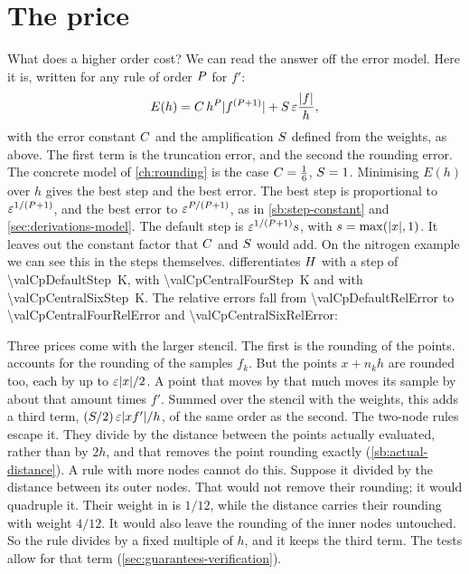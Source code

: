 \section{The price}\label{sec:stencils-price}

What does a higher order cost? We can read the answer off the error model. Here it is, written for any rule of order
$P$ for $f'$:
\begin{equation}
  E(h) = C\, h^{P} \lvert f^{(P + 1)} \rvert + S\, \varepsilon \frac{\lvert f \rvert}{h},
  \label{eq:stencils-model}
\end{equation}
with the error constant $C$ and the amplification $S$ defined from the weights, as above. The first term is
the truncation error, and the second the rounding error. The concrete model of \cref{ch:rounding} is the case
$C = \tfrac16$, $S = 1$. Minimising $E(h)$ over $h$ gives the best step and the best error. The best step is
proportional to $\varepsilon^{1/(P + 1)}$, and the best error to $\varepsilon^{P/(P + 1)}$, as in
\cref{sb:step-constant} and \cref{sec:derivations-model}. The default step is $\varepsilon^{1/(P + 1)} s$,
with $s = \max(\lvert x \rvert, 1)$. It leaves out the constant factor that $C$ and $S$ would add. On the
nitrogen example we can see this in the steps themselves.  differentiates $H$ with a step of
\SI{\valCpDefaultStep}{\kelvin},  with \SI{\valCpCentralFourStep}{\kelvin} and 
with \SI{\valCpCentralSixStep}{\kelvin}. The relative errors fall from \num{\valCpDefaultRelError} to
\num{\valCpCentralFourRelError} and \num{\valCpCentralSixRelError}:

Three prices come with the larger stencil. The first is the rounding of the points. 
accounts for the rounding of the samples $f_k$. But the points $x + n_k h$ are rounded too, each by up to
$\varepsilon \lvert x \rvert / 2$. A point that moves by that much moves its sample by about that amount times $f'$. Summed over
the stencil with the weights, this adds a third term, $(S / 2)\, \varepsilon \lvert x f' \rvert / h$, of the same order as
the second. The two-node rules escape it. They divide by the distance between the points actually evaluated, rather
than by $2h$, and that removes the point rounding exactly (\cref{sb:actual-distance}). A rule with more nodes cannot
do this. Suppose it divided by the distance between its outer nodes. That would not remove their rounding; it would
quadruple it. Their weight in  is $1/12$, while the distance carries their rounding with weight
$4/12$. It would also leave the rounding of the inner nodes untouched. So the rule divides by a fixed multiple of
$h$, and it keeps the third term. The tests allow for that term (\cref{sec:guarantees-verification}).

